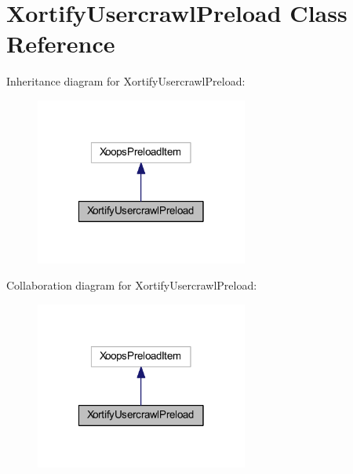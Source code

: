 \hypertarget{class_xortify_usercrawl_preload}{\section{Xortify\-Usercrawl\-Preload Class Reference}
\label{class_xortify_usercrawl_preload}
}


Inheritance diagram for Xortify\-Usercrawl\-Preload\-:
\nopagebreak
\begin{figure}[H]
\begin{center}
\leavevmode
\includegraphics[width=198pt]{class_xortify_usercrawl_preload__inherit__graph}
\end{center}
\end{figure}


Collaboration diagram for Xortify\-Usercrawl\-Preload\-:
\nopagebreak
\begin{figure}[H]
\begin{center}
\leavevmode
\includegraphics[width=198pt]{class_xortify_usercrawl_preload__coll__graph}
\end{center}
\end{figure}
